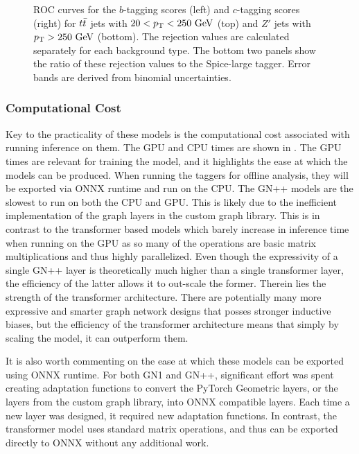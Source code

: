 \begin{figure}[ht]
    \caption{ROC curves for the $b$-tagging scores (left) and $c$-tagging scores (right) for $t\bar{t}$ jets with $20 < \pt < 250~\GeV$ (top) and $Z'$ jets with $\pt > 250~\GeV$ (bottom). The rejection values are calculated separately for each background type. The bottom two panels show the ratio of these rejection values to the Spice-large tagger. Error bands are derived from binomial uncertainties.}
    \label{fig:auxiliary}
\end{figure}


\subsubsection{Computational Cost}

Key to the practicality of these models is the computational cost associated with running inference on them.
The GPU and CPU times are shown in .
The GPU times are relevant for training the model, and it highlights the ease at which the models can be produced.
When running the taggers for offline analysis, they will be exported via ONNX runtime and run on the CPU\@.
The GN++ models are the slowest to run on both the CPU and GPU\@.
This is likely due to the inefficient implementation of the graph layers in the custom graph library.
This is in contrast to the transformer based models which barely increase in inference time when running on the GPU as so many of the operations are basic matrix multiplications and thus highly parallelized.
Even though the expressivity of a single GN++ layer is theoretically much higher than a single transformer layer, the efficiency of the latter allows it to out-scale the former.
Therein lies the strength of the transformer architecture.
There are potentially many more expressive and smarter graph network designs that posses stronger inductive biases, but the efficiency of the transformer architecture means that simply by scaling the model, it can outperform them.

It is also worth commenting on the ease at which these models can be exported using ONNX runtime.
For both GN1 and GN++, significant effort was spent creating adaptation functions to convert the PyTorch Geometric layers, or the layers from the custom graph library, into ONNX compatible layers.
Each time a new layer was designed, it required new adaptation functions.
In contrast, the transformer model uses standard matrix operations, and thus can be exported directly to ONNX without any additional work.

